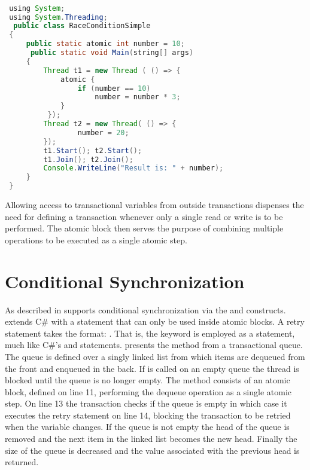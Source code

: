 \begin{lstlisting}[label=lst:stm_atomic_syntax_simplified,
 caption={Transaction Syntax Simplified},
 language=Java, 
 showspaces=false,
 showtabs=false,
 breaklines=true,
 showstringspaces=false,
 breakatwhitespace=true,
 commentstyle=\color{greencomments},
 keywordstyle=\color{bluekeywords},
 stringstyle=\color{redstrings},
 morekeywords={atomic, retry, orElse, var, get, set, using}]  % Start your code-block

 using System;
 using System.Threading;
  public class RaceConditionSimple
 {
     public static atomic int number = 10;
      public static void Main(string[] args)
     {
         Thread t1 = new Thread ( () => {
             atomic {
                 if (number == 10)          
                     number = number * 3;
             }
          });
         Thread t2 = new Thread( () => {
                 number = 20;
         });
         t1.Start(); t2.Start();
         t1.Join(); t2.Join();
         Console.WriteLine("Result is: " + number);
     }
 }
\end{lstlisting}
Allowing access to transactional variables from outside transactions dispenses the need for defining a transaction whenever only a single read or write is to be performed. The atomic block then serves the purpose of combining multiple operations to be executed as a single atomic step.

\section{Conditional Synchronization}\label{sec:sync_design}
As described in  \stmnamesp supports conditional synchronization via the  and  constructs. \stmnamesp extends C\# with a  statement that can only be used inside atomic blocks. A retry statement takes the format: . That is, the keyword is employed as a statement, much like C\#'s  and  statements\cite[p. 102]{sestoft2011c}.  presents the  method from a transactional queue. The queue is defined over a singly linked list from which items are dequeued from the front and enqueued in the back. If  is called on an empty queue the thread is blocked until the queue is no longer empty. The  method consists of an atomic block, defined on line 11, performing the dequeue operation as a single atomic step. On line 13 the transaction checks if the queue is empty in which case it executes the retry statement on line 14, blocking the transaction to be retried when the  variable changes. If the queue is not empty the head of the queue is removed and the next item in the linked list becomes the new head. Finally the size of the queue is decreased and the value associated with the previous head is returned.

